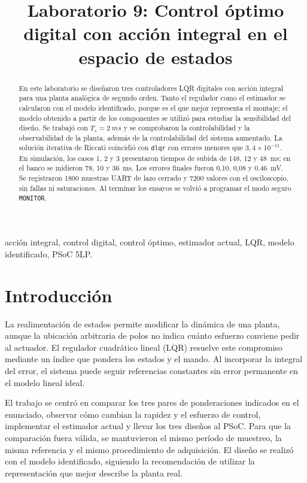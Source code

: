 \documentclass[conference]{IEEEtran}
\title{Laboratorio 9: Control óptimo digital con acción integral en el espacio de estados}
\author{\IEEEauthorblockN{Aldo Pastore}
\IEEEauthorblockA{Automatización -- Ingeniería Electrónica\\
Facultad de Ciencias y Tecnología\\
Universidad Católica ``Nuestra Señora de la Asunción''\\
Asunción, Paraguay\\
\texttt{aldo.pastore@uc.edu.py}}}
\begin{document}
\maketitle

\begin{abstract}
En este laboratorio se diseñaron tres controladores LQR digitales con acción integral para una planta analógica de segundo orden. Tanto el regulador como el estimador se calcularon con el modelo identificado, porque es el que mejor representa el montaje; el modelo obtenido a partir de los componentes se utilizó para estudiar la sensibilidad del diseño. Se trabajó con $T_s=\SI{2}{ms}$ y se comprobaron la controlabilidad y la observabilidad de la planta, además de la controlabilidad del sistema aumentado. La solución iterativa de Riccati coincidió con \texttt{dlqr} con errores menores que $3,4\times10^{-11}$. En simulación, los casos 1, 2 y 3 presentaron tiempos de subida de 148, 12 y \SI{48}{ms}; en el banco se midieron 78, 10 y \SI{36}{ms}. Los errores finales fueron 0,10, 0,08 y \SI{0.46}{mV}. Se registraron 1800 muestras UART de lazo cerrado y 7200 valores con el osciloscopio, sin fallas ni saturaciones. Al terminar los ensayos se volvió a programar el modo seguro \texttt{MONITOR}.
\end{abstract}

\begin{IEEEkeywords}
acción integral, control digital, control óptimo, estimador actual, LQR, modelo identificado, PSoC 5LP.
\end{IEEEkeywords}

\section{Introducción}
La realimentación de estados permite modificar la dinámica de una planta, aunque la ubicación arbitraria de polos no indica cuánto esfuerzo conviene pedir al actuador. El regulador cuadrático lineal (LQR) resuelve este compromiso mediante un índice que pondera los estados y el mando. Al incorporar la integral del error, el sistema puede seguir referencias constantes sin error permanente en el modelo lineal ideal.

El trabajo se centró en comparar los tres pares de ponderaciones indicados en el enunciado, observar cómo cambian la rapidez y el esfuerzo de control, implementar el estimador actual y llevar los tres diseños al PSoC. Para que la comparación fuera válida, se mantuvieron el mismo período de muestreo, la misma referencia y el mismo procedimiento de adquisición. El diseño se realizó con el modelo identificado, siguiendo la recomendación de utilizar la representación que mejor describe la planta real.
\end{document}
